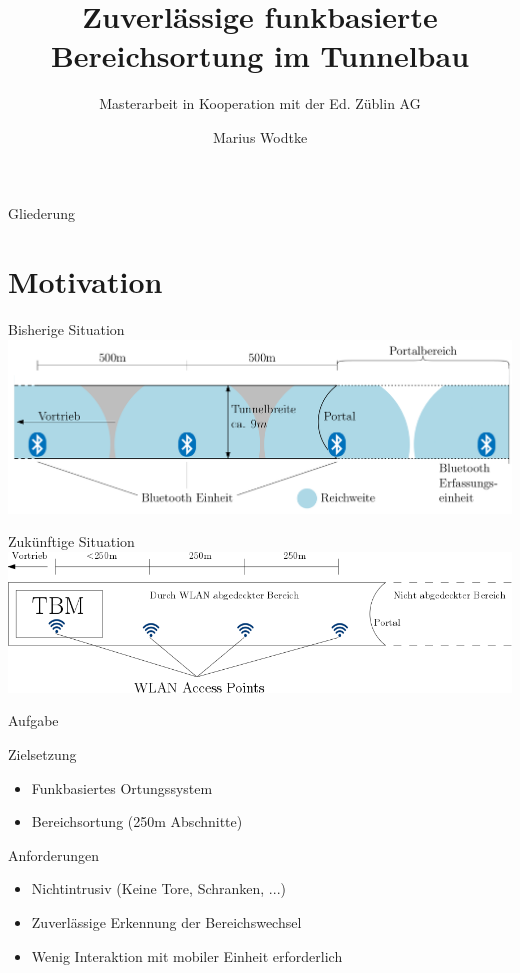 \documentclass[18pt]{beamer}
\title[Funkbasierte Bereichsortung]{Zuverlässige funkbasierte
Bereichsortung im Tunnelbau}
\subtitle{Masterarbeit in Kooperation mit der Ed. Züblin AG}
\author{Marius Wodtke}
\institute{Institut für angewandte Informatik und Formale Beschreibungsverfahren}
\begin{document}

\begin{frame}
\titlepage
\end{frame}

\begin{frame}{Gliederung}
	\tableofcontents[hideallsubsections]
\end{frame}

\section{Motivation}
\begin{frame}{Bisherige Situation}
	\includegraphics[width=\textwidth]{images/bisherige.png}\\
	\cite{maurer2016unterstuetzung}
\end{frame}

\begin{frame}{Zukünftige Situation}
	\includegraphics[width=\textwidth]{images/zukuenftige.png}
\end{frame}

\begin{frame}{Aufgabe}
	\begin{block}{Zielsetzung}
		\begin{itemize}
			\item Funkbasiertes Ortungssystem
			\item Bereichsortung (250m Abschnitte)
		\end{itemize}
	\end{block}


	\begin{block}{Anforderungen}
		\begin{itemize}
			\item Nichtintrusiv (Keine Tore, Schranken, ...)
			\item Zuverlässige Erkennung der Bereichswechsel
			\item Wenig Interaktion mit mobiler Einheit erforderlich
		\end{itemize}
	\end{block}
\end{frame}
\end{document}
